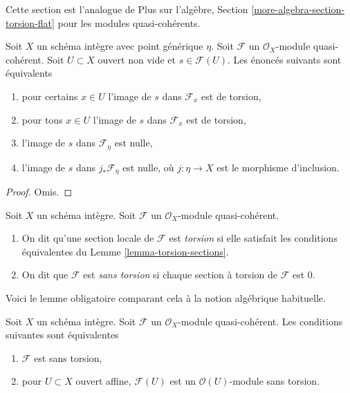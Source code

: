 \noindent
Cette section est l'analogue de Plus sur l'algèbre, Section  \ref{more-algebra-section-torsion-flat}  pour les
modules quasi-cohérents.

\begin{lemma}
\label{lemma-torsion-sections}
Soit  $X$  un schéma intègre avec point générique  $\eta$. Soit
 $\mathcal{F}$  un  $\mathcal{O}_X$-module quasi-cohérent. Soit  $U \subset X$  ouvert non
vide et  $s \in \mathcal{F}(U)$. Les énoncés suivants sont équivalents
\begin{enumerate}
\item pour certains  $x \in U$  l'image de  $s$  dans  $\mathcal{F}_x$  est de
torsion,
\item pour tous  $x \in U$  l'image de  $s$  dans  $\mathcal{F}_x$  est de torsion,
\item l'image de  $s$  dans  $\mathcal{F}_\eta$  est nulle,
\item l'image de  $s$  dans  $j_*\mathcal{F}_\eta$  est nulle, où  $j : \eta \to X$  est le
morphisme d'inclusion.
\end{enumerate}
\end{lemma}

\begin{proof}
Omis.
\end{proof}

\begin{definition}
\label{definition-torsion}
Soit  $X$  un schéma intègre. Soit  $\mathcal{F}$  un  $\mathcal{O}_X$-module
quasi-cohérent.
\begin{enumerate}
\item On dit qu'une section locale de  $\mathcal{F}$  est  {\it 
torsion}  si elle satisfait les conditions équivalentes du Lemme
 \ref{lemma-torsion-sections}.
\item On dit que  $\mathcal{F}$  est  {\it  sans torsion}  si
chaque section à torsion de  $\mathcal{F}$  est  $0$.
\end{enumerate}
\end{definition}

\noindent
Voici le lemme obligatoire comparant cela à la notion algébrique habituelle.

\begin{lemma}
\label{lemma-check-torsion-on-affines}
Soit  $X$  un schéma intègre. Soit  $\mathcal{F}$  un  $\mathcal{O}_X$-module
quasi-cohérent. Les conditions suivantes sont équivalentes
\begin{enumerate}
\item $\mathcal{F}$  est sans torsion,
\item pour  $U \subset X$  ouvert affine,  $\mathcal{F}(U)$  est un  $\mathcal{O}(U)$-module sans
torsion.
\end{enumerate}
\end{lemma}

